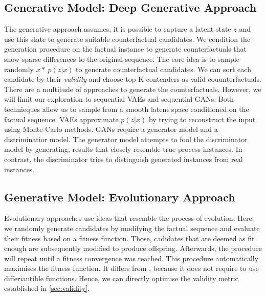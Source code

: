 \documentclass[./../../paper.tex]{subfiles}
\begin{document}
\subsection{Generative Model: Deep Generative Approach}
The generative approach assumes, it is possible to capture a latent state $z$ and use this state to generate suitable counterfactual candidates. We condition the generation procedure on the factual instance to generate counterfactuals that show sparse differences to the original sequence. The core idea is to sample randomly $x* ~ p(z|x)$ to generate counterfactual candidates. We can sort each candidate by their \emph{validity} and choose top-K contenders as valid couunterfactuals. There are a multitude of approaches to generate the counterfactuals. However, we will limit our exploration to sequential \glspl{VAE} and sequential \glspl{GAN}. Both technieques allow us to sample from a smooth latent space conditioned on the factual sequence. \glspl{VAE} approximate $p(z|x)$ by trying to reconstruct the input using Monte-Carlo methods. \glspl{GAN} require a generator model and a distriminatior model. The generator model attempts to fool the discriminator model by generating, results that closely resemble true process instances. In contrast, the discriminator tries to distinguish generated instances from real instances. 


\subsection{Generative Model: Evolutionary Approach}
Evolutionary approaches use ideas that resemble the process of evolution\needscite{}. Here, we randomly generate candidates by modifying the factual sequence and evaluate their fitness based on a fitness function. Those, cadidates that are deemed as fit enough are subsequently modified to produce offspring. Afterwards, the procedure will repeat until a fitness convergence was reached. This procedure automatically maximises the fitness function. It differs from , because it does not require to use differiantible functions. 
Hence, we can directly optimise the validity metric established in \autoref{sec:validity}.
\end{document}
